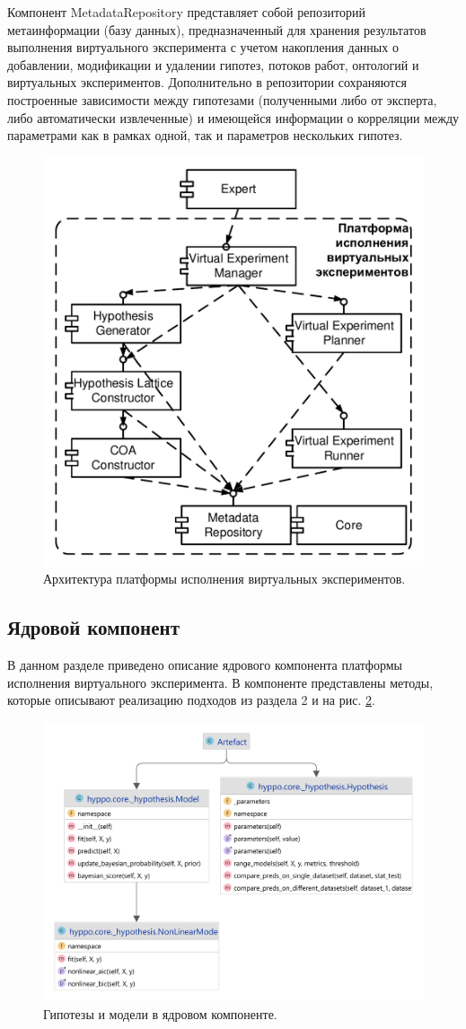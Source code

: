 Компонент MetadataRepository представляет собой репозиторий метаинформации (базу данных), предназначенный для хранения 
результатов выполнения виртуального эксперимента с учетом накопления данных о добавлении, модификации и удалении 
гипотез, потоков работ, онтологий и виртуальных экспериментов. Дополнительно в репозитории сохраняются построенные 
зависимости между гипотезами (полученными либо от эксперта, либо автоматически извлеченные) и имеющейся информации 
о корреляции между параметрами как в рамках одной, так и параметров нескольких гипотез.

\begin{figure}[h!]
    \centering
    \includegraphics[width=0.7\linewidth]{images/arch_v4.pdf}
    \caption{Архитектура платформы исполнения виртуальных экспериментов.}\label{fig:arch}
\end{figure}

\subsection{Ядровой компонент}
В данном разделе приведено описание ядрового компонента платформы исполнения виртуального эксперимента.
В компоненте представлены методы, которые описывают реализацию подходов из раздела 2 и 
на рис. \cref{fig:core_hypothesis}. 

\begin{figure}[ht]
    \centering
    \includegraphics[width=0.7\linewidth]{images/_hypothesis.pdf}
    \caption{Гипотезы и модели в ядровом компоненте.}\label{fig:core_hypothesis}
\end{figure}

